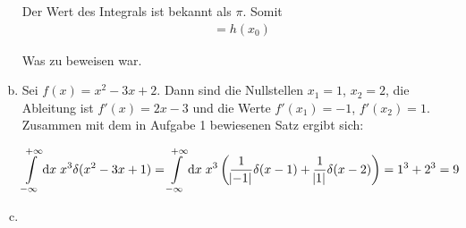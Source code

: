\documentclass[a4paper,german,12pt,smallheadings]{scrartcl}
\begin{document}
\begin{enumerate}[a)]
    Der Wert des Integrals ist bekannt als $\pi$. Somit
    \begin{align}
      &= h(x_0)
    \end{align}

    Was zu beweisen war.

  \item
    Sei $f(x) = x^2 - 3x + 2$. Dann sind die Nullstellen $x_1 = 1$, $x_2 = 2$,
    die Ableitung ist $f'(x) = 2x - 3$ und die Werte $f'(x_1) = -1$, $f'(x_2) =
    1$. Zusammen mit dem in Aufgabe 1 bewiesenen Satz ergibt sich:

    \begin{equation}
      \int\limits_{-\infty}^{+\infty} \dif x \; x^3 \delta(x^2 - 3x + 1)
      =
      \int\limits_{-\infty}^{+\infty} \dif x \; x^3 \del{
        \frac{1}{\envert{-1}} \delta(x - 1) +
        \frac{1}{\envert{1}} \delta(x - 2)
      }
      = 1^3 + 2^3 = 9
    \end{equation}

  \item
\end{enumerate}
\end{document}
